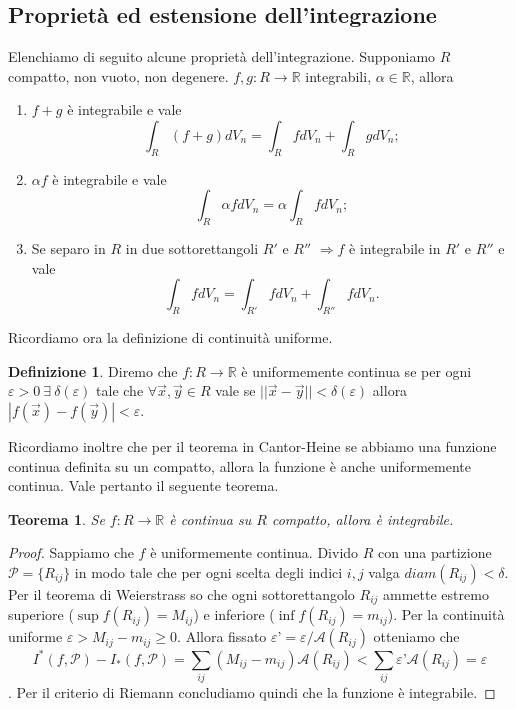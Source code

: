 \documentclass[10pt]{article}
\theoremstyle{plain}
\newtheorem{thm}{Teorema}[section]
\theoremstyle{definition}
\newtheorem{defn}{Definizione}
\begin{document}
 \subsection{Proprietà ed estensione dell'integrazione}
 Elenchiamo di seguito alcune proprietà dell'integrazione. Supponiamo $R$ compatto, non vuoto, non degenere. $f,g:R\to\mathbb{R}$ integrabili, $\alpha \in \mathbb{R}$, allora 
 \begin{enumerate}
     \item $f+g$ è integrabile e vale $$\int_R(f+g)dV_n=\int_RfdV_n+\int_RgdV_n;$$
     \item $\alpha f$ è integrabile e vale 
     $$\int_R \alpha fdV_n=\alpha \int_RfdV_n;$$
     \item Se separo in $R$ in due sottorettangoli $R'$ e $R''$ $\Rightarrow f$ è integrabile in $R'$ e $R''$  e vale
      $$\int_R fdV_n=\int_{R'}fdV_n+\int_{R''}fdV_n.$$
 \end{enumerate}
 Ricordiamo ora la definizione di continuità uniforme.
 \begin{defn}
 Diremo che $f:R\to\mathbb{R}$ è uniformemente continua se per ogni $\varepsilon>0\ \exists \ \delta(\varepsilon)$ tale che $\forall \vec{x}, \vec{y} \in R$ vale se $||\vec{x}-\vec{y}||<\delta (\varepsilon)$ allora $|f(\vec{x})-f(\vec{y})|<\varepsilon$.
 \end{defn}
 Ricordiamo inoltre che per il teorema in Cantor-Heine se abbiamo una funzione continua definita su un compatto, allora la funzione è anche uniformemente continua. Vale pertanto il seguente teorema.
 \begin{thm}
   Se $f:R\to\mathbb{R}$ è continua su $R$ compatto, allora è integrabile.
 \end{thm}
\begin{proof}
Sappiamo che $f$ è uniformemente continua. Divido $R$ con una partizione $\mathcal{P}= \{ R_{ij} \}$ in modo tale che per ogni scelta degli indici $i,j$ valga $diam(R_{ij})< \delta$. Per il teorema di Weierstrass so che ogni sottorettangolo $R_{ij}$ ammette estremo superiore ($\sup f(R_{ij})=M_{ij}$) e inferiore ($\inf f(R_{ij})=m_{ij}$). Per la continuità uniforme $\varepsilon > M_{ij}-m_{ij}\geq 0$. Allora fissato $\varepsilon’=\varepsilon/\mathcal{A}(R_{ij})$ otteniamo che 
$$I^*(f, \mathcal{P})- I_*(f, \mathcal{P})=\sum_{ij}(M_{ij}-m_{ij})\mathcal{A}(R_{ij})<\sum_{ij}\varepsilon’\mathcal{A}(R_{ij})=\varepsilon$$. Per il criterio di Riemann concludiamo quindi che la funzione è integrabile.        
\end{proof}
\end{document}
